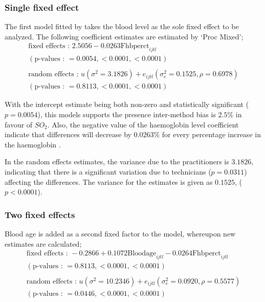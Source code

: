 \documentclass[12pt, a4paper]{report}
\theoremstyle{plain}
\theoremstyle{definition}
\theoremstyle{remark}
\begin{document}
	\subsubsection{Single fixed effect} The first model fitted by \citet{LaiShiao} takes the
	blood level as the sole fixed effect to be analyzed. The following
	coefficient estimates are estimated by `Proc Mixed';
	\begin{eqnarray}
	\mbox{fixed effects :   } 2.5056 - 0.0263\mbox{Fhbperct}_{ijtl} \\
	(\mbox{p-values :   } = 0.0054, <0.0001, <0.0001)\nonumber\\\nonumber\\
	\mbox{random effects :   } u(\sigma^{2}=3.1826) + e_{ijtl}
	(\sigma^{2}_{e}=0.1525, \rho= 0.6978) \nonumber\\
	(\mbox{p-values :   } = 0.8113, <0.0001, <0.0001)\nonumber
	\end{eqnarray}
	
	With the intercept estimate being both non-zero and statistically
	significant ($p=0.0054$), this models supports the presence
	inter-method bias is $2.5\%$ in favour of $SO_{2}$. Also, the
	negative value of the haemoglobin level coefficient indicate that
	differences will decrease by $0.0263\%$ for every percentage
	increase in the haemoglobin .
	
	In the random effects estimates, the variance due to the
	practitioners is $3.1826$, indicating that there is a significant
	variation due to technicians ($p=0.0311$) affecting the
	differences. The variance for the estimates is given as $0.1525$,
	($p<0.0001$).
	
	\subsubsection{Two fixed effects}
	Blood age is added as a second fixed factor to the model,
	whereupon new estimates are calculated;
	\begin{eqnarray}
	\mbox{fixed effects :   } -0.2866 + 0.1072 \mbox{Bloodage}_{ijtl}
	- 0.0264\mbox{Fhbperct}_{ijtl}\nonumber\\
	( \mbox{p-values :   } = 0.8113, <0.0001, <0.0001)\nonumber\\\nonumber\\
	\mbox{random effects :   } u(\sigma^{2}=10.2346) + e_{ijtl}
	(\sigma^{2}_{e}=0.0920, \rho= 0.5577) \nonumber\\
	(\mbox{p-values :   } = 0.0446, <0.0001, <0.0001)
	\end{eqnarray}
	
\end{document}
